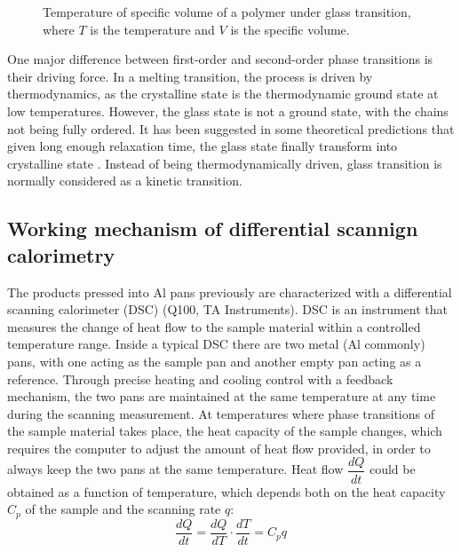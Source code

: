 \begin{figure}[H]
	\center
	\vspace{1 cm}
	\caption{Temperature of specific volume of a polymer under glass transition, where $T$ is the temperature and $V$ is the specific volume.}
	\label{fig:V vs T for Tg}
\end{figure}

One major difference between first-order and second-order phase transitions is their driving force. In a melting transition, the process is driven by thermodynamics, as the crystalline state is the thermodynamic ground state at low temperatures. However, the glass state is not a ground state, with the chains not being fully ordered. It has been suggested in some theoretical predictions that given long enough relaxation time, the glass state finally transform into crystalline state \cite{Gotze2009}. Instead of being thermodynamically driven, glass transition is normally considered as a kinetic transition.

\subsection{Working mechanism of differential scannign calorimetry}

The products pressed into Al pans previously are characterized with a differential scanning calorimeter (DSC) (Q100, TA Instruments). DSC is an instrument that measures the change of heat flow to the sample material within a controlled temperature range. Inside a typical DSC there are two metal (Al commonly) pans, with one acting as the sample pan and another empty pan acting as a reference. Through precise heating and cooling control with a feedback mechanism, the two pans are maintained at the same temperature at any time during the scanning measurement. At temperatures where phase transitions of the sample material takes place, the heat capacity of the sample changes, which requires the computer to adjust the amount of heat flow provided, in order to always keep the two pans at the same temperature. Heat flow $\dfrac{dQ}{dt}$ could be obtained as a function of temperature, which depends both on the heat capacity $C_{p}$ of the sample and the scanning rate $q$:
\begin{equation}
\label{eqn_DSC}
\dfrac{dQ}{dt} = \dfrac{dQ}{dT}\cdot\dfrac{dT}{dt} = C_{p} q
\end{equation}

